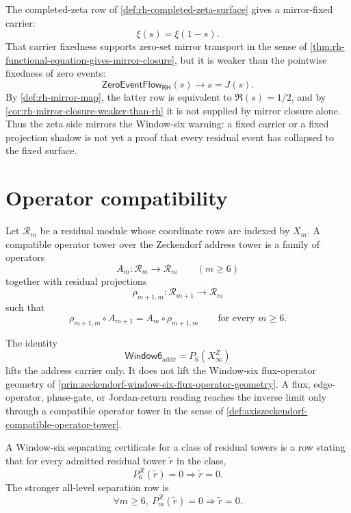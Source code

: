 \begin{principle}
\label{prin:axiszeckendorf-carrier-fixedness-not-orbit-collapse}
The completed-zeta row of \autoref{def:rh-completed-zeta-surface} gives a
mirror-fixed carrier:
$$
\xi(s)=\xi(1-s).
$$
That carrier fixedness supports zero-set mirror transport in the sense of
\autoref{thm:rh-functional-equation-gives-mirror-closure}, but it is weaker
than the pointwise fixedness of zero events:
$$
\mathsf{ZeroEventFlow}_{\mathsf{RH}}(s)
\to
s=J(s).
$$
By \autoref{def:rh-mirror-map}, the latter row is equivalent to
$\Re(s)=1/2$, and by \autoref{cor:rh-mirror-closure-weaker-than-rh} it is not
supplied by mirror closure alone.  Thus the zeta side mirrors the
Window-six warning: a fixed carrier or a fixed projection shadow is not yet a
proof that every residual event has collapsed to the fixed surface.
\end{principle}

\section{Operator compatibility}
\label{sec:axiszeckendorf-operator-compatibility}

\begin{definition}
\label{def:axiszeckendorf-compatible-operator-tower}
Let $\mathcal R_m$ be a residual module whose coordinate rows are indexed by
$X_m$.  A compatible operator tower over the Zeckendorf address tower is a
family of operators
$$
A_m:\mathcal R_m\to\mathcal R_m
\qquad
(m\geq 6)
$$
together with residual projections
$$
\rho_{m+1,m}:\mathcal R_{m+1}\to\mathcal R_m
$$
such that
$$
\rho_{m+1,m}\circ A_{m+1}
=
A_m\circ\rho_{m+1,m}
\qquad
\text{for every }m\geq 6.
$$
\end{definition}

\begin{principle}
\label{prin:axiszeckendorf-address-does-not-lift-flux}
The identity
$$
\mathsf{Window6}_{\mathrm{addr}}=P_6(X_\infty^Z)
$$
lifts the address carrier only.  It does not lift the Window-six
flux-operator geometry of
\autoref{prin:zeckendorf-window-six-flux-operator-geometry}.  A flux,
edge-operator, phase-gate, or Jordan-return reading reaches the inverse
limit only through a compatible operator tower in the sense of
\autoref{def:axiszeckendorf-compatible-operator-tower}.
\end{principle}

\begin{definition}
\label{def:axiszeckendorf-window-six-separating-certificate}
A Window-six separating certificate for a class of residual towers is a row
stating that for every admitted residual tower $\widetilde r$ in the class,
$$
P_6^{\mathcal R}(\widetilde r)=0
\Longrightarrow
\widetilde r=0.
$$
The stronger all-level separation row is
$$
\forall m\geq 6,\ P_m^{\mathcal R}(\widetilde r)=0
\Longrightarrow
\widetilde r=0.
$$
\end{definition}

